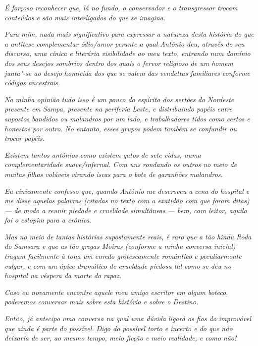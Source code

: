 \emph{É forçoso reconhecer que, lá no fundo, o conservador e o
transgressor trocam conteúdos e são mais interligados do que se
imagina.}

\emph{Para mim, nada mais significativo para expressar a natureza desta
história do que a antítese complementar ódio/amor perante a qual Antônio
deu, através de seu discurso, uma cínica e literária visibilidade ao meu
texto, entrando num domínio dos seus desejos sombrios dentro dos quais o
fervor religioso de um homem junta"-se ao desejo homicida dos que se
valem das vendettas familiares conforme códigos ancestrais.}~

\emph{Na minha opinião tudo isso é um pouco do espírito dos sertões do
Nordeste presente em Sampa, presente na periferia Leste, e distribuindo
papéis entre supostos bandidos ou malandros por um lado, e trabalhadores
tidos como certos e honestos por outro. No entanto, esses grupos
podem também se confundir ou trocar papéis.}

\emph{Existem tantos antônios como existem gatos de sete vidas, numa
complementaridade suave/infernal. Com uns rondando os outros no meio de
muitas filhas volúveis virando iscas para o bote de garanhões
malandros.}~

\emph{Eu cinicamente confesso que, quando Antônio me descreveu a cena do
hospital e me disse aquelas palavras (citadas no texto com a exatidão
com que foram ditas) --- de modo a reunir piedade e crueldade
simultâneas --- bem, caro leitor, aquilo foi o estopim para a crônica.}~

\emph{Mas no meio de tantas histórias supostamente reais, é raro que a
tão hindu Roda do Samsara e que as tão gregas Moiras (conforme a minha
conversa inicial) tragam facilmente à tona um enredo grotescamente
romântico e peculiarmente vulgar, e com um ápice dramático de crueldade
piedosa tal como se deu no hospital na véspera da morte do rapaz.}~

\emph{Caso eu novamente encontre aquele meu amigo escritor em algum
boteco, poderemos conversar mais sobre esta história e sobre o Destino.}~

\emph{Então, já antecipo uma conversa na qual uma dúvida ligará os
fios do improvável que ainda é parte do possível. Digo do possível torto
e incerto e do que não deixaria de ser, ao mesmo tempo, meio ficção e meio
realidade, e como não!~}
\endgroup